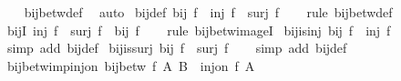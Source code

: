 \begin{isabellebody}
%
\isadelimproof
\ \ %
\endisadelimproof
%
\isatagproof
{}\isamarkupfalse%
\ bij{\isacharunderscore}{\kern0pt}betw{\isacharunderscore}{\kern0pt}def\ \isamarkupfalse%
\ auto%
\endisatagproof
{\isafoldproof}%
%
\isadelimproof
\isanewline
%
\endisadelimproof
\isanewline
{}\isamarkupfalse%
\ bij{\isacharunderscore}{\kern0pt}def{\isacharcolon}{\kern0pt}\ {\isachardoublequoteopen}bij\ f\ {\isasymlongleftrightarrow}\ inj\ f\ {\isasymand}\ surj\ f{\isachardoublequoteclose}\isanewline
%
\isadelimproof
\ \ %
\endisadelimproof
%
\isatagproof
{}\isamarkupfalse%
\ {\isacharparenleft}{\kern0pt}rule\ bij{\isacharunderscore}{\kern0pt}betw{\isacharunderscore}{\kern0pt}def{\isacharparenright}{\kern0pt}%
\endisatagproof
{\isafoldproof}%
%
\isadelimproof
\isanewline
%
\endisadelimproof
\isanewline
{}\isamarkupfalse%
\ bijI{\isacharcolon}{\kern0pt}\ {\isachardoublequoteopen}inj\ f\ {\isasymLongrightarrow}\ surj\ f\ {\isasymLongrightarrow}\ bij\ f{\isachardoublequoteclose}\isanewline
%
\isadelimproof
\ \ %
\endisadelimproof
%
\isatagproof
{}\isamarkupfalse%
\ {\isacharparenleft}{\kern0pt}rule\ bij{\isacharunderscore}{\kern0pt}betw{\isacharunderscore}{\kern0pt}imageI{\isacharparenright}{\kern0pt}%
\endisatagproof
{\isafoldproof}%
%
\isadelimproof
\isanewline
%
\endisadelimproof
\isanewline
{}\isamarkupfalse%
\ bij{\isacharunderscore}{\kern0pt}is{\isacharunderscore}{\kern0pt}inj{\isacharcolon}{\kern0pt}\ {\isachardoublequoteopen}bij\ f\ {\isasymLongrightarrow}\ inj\ f{\isachardoublequoteclose}\isanewline
%
\isadelimproof
\ \ %
\endisadelimproof
%
\isatagproof
{}\isamarkupfalse%
\ {\isacharparenleft}{\kern0pt}simp\ add{\isacharcolon}{\kern0pt}\ bij{\isacharunderscore}{\kern0pt}def{\isacharparenright}{\kern0pt}%
\endisatagproof
{\isafoldproof}%
%
\isadelimproof
\isanewline
%
\endisadelimproof
\isanewline
{}\isamarkupfalse%
\ bij{\isacharunderscore}{\kern0pt}is{\isacharunderscore}{\kern0pt}surj{\isacharcolon}{\kern0pt}\ {\isachardoublequoteopen}bij\ f\ {\isasymLongrightarrow}\ surj\ f{\isachardoublequoteclose}\isanewline
%
\isadelimproof
\ \ %
\endisadelimproof
%
\isatagproof
{}\isamarkupfalse%
\ {\isacharparenleft}{\kern0pt}simp\ add{\isacharcolon}{\kern0pt}\ bij{\isacharunderscore}{\kern0pt}def{\isacharparenright}{\kern0pt}%
\endisatagproof
{\isafoldproof}%
%
\isadelimproof
\isanewline
%
\endisadelimproof
\isanewline
{}\isamarkupfalse%
\ bij{\isacharunderscore}{\kern0pt}betw{\isacharunderscore}{\kern0pt}imp{\isacharunderscore}{\kern0pt}inj{\isacharunderscore}{\kern0pt}on{\isacharcolon}{\kern0pt}\ {\isachardoublequoteopen}bij{\isacharunderscore}{\kern0pt}betw\ f\ A\ B\ {\isasymLongrightarrow}\ inj{\isacharunderscore}{\kern0pt}on\ f\ A{\isachardoublequoteclose}\isanewline

\end{isabellebody}
